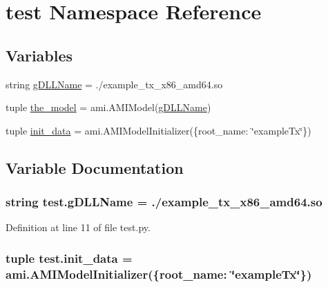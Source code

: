 \hypertarget{namespacetest}{}\section{test Namespace Reference}
\label{namespacetest}
\subsection*{Variables}
\begin{DoxyCompactItemize}
\item 
string \hyperlink{namespacetest_a80f837d5da2fad005c3ba8151a77ff62}{g\+D\+L\+L\+Name} = \textquotesingle{}./example\+\_\+tx\+\_\+x86\+\_\+amd64.\+so\textquotesingle{}
\item 
tuple \hyperlink{namespacetest_a353d01c7c783fd0d6d6287c760facb41}{the\+\_\+model} = ami.\+A\+M\+I\+Model(\hyperlink{namespacetest_a80f837d5da2fad005c3ba8151a77ff62}{g\+D\+L\+L\+Name})
\item 
tuple \hyperlink{namespacetest_aebc7edb91e3546a519a0954d1fc0130d}{init\+\_\+data} = ami.\+A\+M\+I\+Model\+Initializer(\{\textquotesingle{}root\+\_\+name\textquotesingle{}\+: \char`\"{}example\+Tx\char`\"{}\})
\end{DoxyCompactItemize}


\subsection{Variable Documentation}
\hypertarget{namespacetest_a80f837d5da2fad005c3ba8151a77ff62}{}
\subsubsection[{g\+D\+L\+L\+Name}]{\setlength{\rightskip}{0pt plus 5cm}string test.\+g\+D\+L\+L\+Name = \textquotesingle{}./example\+\_\+tx\+\_\+x86\+\_\+amd64.\+so\textquotesingle{}}\label{namespacetest_a80f837d5da2fad005c3ba8151a77ff62}


Definition at line 11 of file test.\+py.

\hypertarget{namespacetest_aebc7edb91e3546a519a0954d1fc0130d}{}
\subsubsection[{init\+\_\+data}]{\setlength{\rightskip}{0pt plus 5cm}tuple test.\+init\+\_\+data = ami.\+A\+M\+I\+Model\+Initializer(\{\textquotesingle{}root\+\_\+name\textquotesingle{}\+: \char`\"{}example\+Tx\char`\"{}\})}\label{namespacetest_aebc7edb91e3546a519a0954d1fc0130d}


